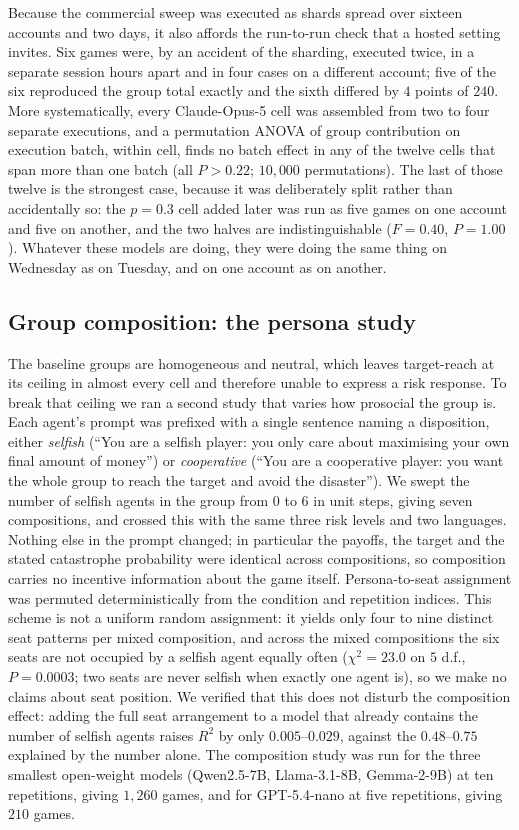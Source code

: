 \documentclass[openacc]{rsproca_new}
\begin{document}
Because the commercial sweep was executed as shards spread over sixteen accounts and two days, it also affords the run-to-run check that a hosted setting invites. Six games were, by an accident of the sharding, executed twice, in a separate session hours apart and in four cases on a different account; five of the six reproduced the group total exactly and the sixth differed by $4$ points of $240$. More systematically, every Claude-Opus-5 cell was assembled from two to four separate executions, and a permutation ANOVA of group contribution on execution batch, within cell, finds no batch effect in any of the twelve cells that span more than one batch (all $P>0.22$; $10{,}000$ permutations). The last of those twelve is the strongest case, because it was deliberately split rather than accidentally so: the $p=0.3$ cell added later was run as five games on one account and five on another, and the two halves are indistinguishable ($F=0.40$, $P=1.00$). Whatever these models are doing, they were doing the same thing on Wednesday as on Tuesday, and on one account as on another.

\subsection{Group composition: the persona study}
\label{sec:personamethods}
The baseline groups are homogeneous and neutral, which leaves target-reach at its ceiling in almost every cell and therefore unable to express a risk response. To break that ceiling we ran a second study that varies how prosocial the group is. Each agent's prompt was prefixed with a single sentence naming a disposition, either \emph{selfish} (``You are a selfish player: you only care about maximising your own final amount of money'') or \emph{cooperative} (``You are a cooperative player: you want the whole group to reach the target and avoid the disaster''). We swept the number of selfish agents in the group from $0$ to $6$ in unit steps, giving seven compositions, and crossed this with the same three risk levels and two languages. Nothing else in the prompt changed; in particular the payoffs, the target and the stated catastrophe probability were identical across compositions, so composition carries no incentive information about the game itself. Persona-to-seat assignment was permuted deterministically from the condition and repetition indices. This scheme is not a uniform random assignment: it yields only four to nine distinct seat patterns per mixed composition, and across the mixed compositions the six seats are not occupied by a selfish agent equally often ($\chi^2=23.0$ on $5$ d.f., $P=0.0003$; two seats are never selfish when exactly one agent is), so we make no claims about seat position. We verified that this does not disturb the composition effect: adding the full seat arrangement to a model that already contains the number of selfish agents raises $R^2$ by only $0.005$--$0.029$, against the $0.48$--$0.75$ explained by the number alone. The composition study was run for the three smallest open-weight models (Qwen2.5-7B, Llama-3.1-8B, Gemma-2-9B) at ten repetitions, giving $1{,}260$ games, and for GPT-5.4-nano at five repetitions, giving $210$ games.
\end{document}

